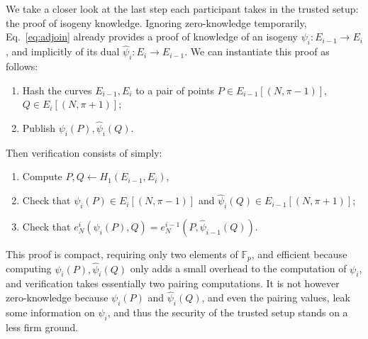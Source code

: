 \documentclass{llncs}
\newcommand{\F}{\mathbb{F}}
\begin{document}
We take a closer look at the last step each participant takes in the
trusted setup: the proof of isogeny knowledge. %
Ignoring zero-knowledge temporarily, Eq.~\eqref{eq:adjoin} already
provides a proof of knowledge of an isogeny $\psi_i:E_{i-1} \to E_i$,
and implicitly of its dual $\hat\psi_i: E_i \to E_{i-1}$.  
We can instantiate this proof as follows:
\begin{enumerate}
\item Hash the curves $E_{i-1},E_i$ to a pair of points
  $P\in E_{i-1}[(N,\pi-1)]$, $Q\in E_i[(N,\pi+1)]$;
\item Publish $\psi_i(P), \hat\psi_i(Q)$.
\end{enumerate}
Then verification consists of simply:
\begin{enumerate}
\item Compute $P,Q\gets H_1(E_{i-1},E_i)$,
\item Check that $\psi_i(P)\in E_i[(N,\pi-1)]$ and
  $\hat\psi_i(Q)\in E_{i-1}[(N,\pi+1)]$;
\item Check that
  $e_N^i(\psi_i(P),Q) = e_N^{i-1}(P,\hat\psi_{i-1}(Q))$.
\end{enumerate}

This proof is compact, requiring only two elements of $\F_p$, and
efficient because computing $\psi_i(P),\hat\psi_i(Q)$ only adds a
small overhead to the computation of $\psi_i$, and verification takes
essentially two pairing computations. %
It is not however zero-knowledge because $\psi_i(P)$ and
$\hat\psi_i(Q)$, and even the pairing values, leak some information on
$\psi_i$, and thus the security of the trusted setup stands on a less
firm ground.
\end{document}
